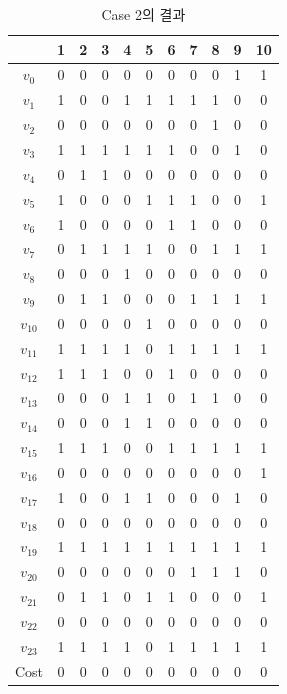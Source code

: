 \documentclass[12pt,a4paper]{article}
\begin{document}
    \begin{table}[htb!]
    \centering
    \begin{tabular}{c c c c c c c c c c c}
        \hline
        & 1 & 2 & 3 & 4 & 5 & 6 & 7 & 8 & 9 & 10 \\
        \hline
        $v_0$ & 0 & 0 & 0 & 0 & 0 & 0 & 0 & 0 & 1 & 1 \\
        $v_1$ & 1 & 0 & 0 & 1 & 1 & 1 & 1 & 1 & 0 & 0 \\
        $v_2$ & 0 & 0 & 0 & 0 & 0 & 0 & 0 & 1 & 0 & 0 \\
        $v_3$ & 1 & 1 & 1 & 1 & 1 & 1 & 0 & 0 & 1 & 0 \\
        $v_4$ & 0 & 1 & 1 & 0 & 0 & 0 & 0 & 0 & 0 & 0 \\
        $v_5$ & 1 & 0 & 0 & 0 & 1 & 1 & 1 & 0 & 0 & 1 \\
        $v_6$ & 1 & 0 & 0 & 0 & 0 & 1 & 1 & 0 & 0 & 0 \\
        $v_7$ & 0 & 1 & 1 & 1 & 1 & 0 & 0 & 1 & 1 & 1 \\
        $v_8$ & 0 & 0 & 0 & 1 & 0 & 0 & 0 & 0 & 0 & 0 \\
        $v_9$ & 0 & 1 & 1 & 0 & 0 & 0 & 1 & 1 & 1 & 1 \\
        $v_{10}$ & 0 & 0 & 0 & 0 & 1 & 0 & 0 & 0 & 0 & 0 \\
        $v_{11}$ & 1 & 1 & 1 & 1 & 0 & 1 & 1 & 1 & 1 & 1 \\
        $v_{12}$ & 1 & 1 & 1 & 0 & 0 & 1 & 0 & 0 & 0 & 0 \\
        $v_{13}$ & 0 & 0 & 0 & 1 & 1 & 0 & 1 & 1 & 0 & 0 \\
        $v_{14}$ & 0 & 0 & 0 & 1 & 1 & 0 & 0 & 0 & 0 & 0 \\
        $v_{15}$ & 1 & 1 & 1 & 0 & 0 & 1 & 1 & 1 & 1 & 1 \\
        $v_{16}$ & 0 & 0 & 0 & 0 & 0 & 0 & 0 & 0 & 0 & 1 \\
        $v_{17}$ & 1 & 0 & 0 & 1 & 1 & 0 & 0 & 0 & 1 & 0 \\
        $v_{18}$ & 0 & 0 & 0 & 0 & 0 & 0 & 0 & 0 & 0 & 0 \\
        $v_{19}$ & 1 & 1 & 1 & 1 & 1 & 1 & 1 & 1 & 1 & 1 \\
        $v_{20}$ & 0 & 0 & 0 & 0 & 0 & 0 & 1 & 1 & 1 & 0 \\
        $v_{21}$ & 0 & 1 & 1 & 0 & 1 & 1 & 0 & 0 & 0 & 1 \\
        $v_{22}$ & 0 & 0 & 0 & 0 & 0 & 0 & 0 & 0 & 0 & 0 \\
        $v_{23}$ & 1 & 1 & 1 & 1 & 0 & 1 & 1 & 1 & 1 & 1 \\
        Cost & 0 & 0 & 0 & 0 & 0 & 0 & 0 & 0 & 0 & 0 \\
       \hline
    \end{tabular}
    \caption{Case 2의 결과}
    \label{tab:result2}
    \end{table}
\end{document}

